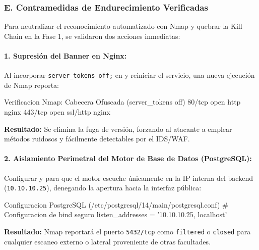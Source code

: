\subsubsection*{E. Contramedidas de Endurecimiento Verificadas}

Para neutralizar el reconocimiento automatizado con Nmap y quebrar la Kill Chain en la Fase 1, se validaron dos acciones inmediatas:

\paragraph{1. Supresión del Banner en Nginx:}
Al incorporar \texttt{server\_tokens off;} en  y reiniciar el servicio, una nueva ejecución de Nmap reporta:

\begin{cmdbox}{Verificacion Nmap: Cabecera Ofuscada (server\_tokens off)}
80/tcp  open  http     nginx
443/tcp open  ssl/http nginx
\end{cmdbox}

\textbf{Resultado:} Se elimina la fuga de versión, forzando al atacante a emplear métodos ruidosos y fácilmente detectables por el IDS/WAF.

\newpage
\paragraph{2. Aislamiento Perimetral del Motor de Base de Datos (PostgreSQL):}
Configurar  y  para que el motor escuche únicamente en la IP interna del backend (\texttt{10.10.10.25}), denegando la apertura hacia la interfaz pública:

\begin{cmdbox}{Configuracion PostgreSQL (/etc/postgresql/14/main/postgresql.conf)}
# Configuracion de bind seguro
listen_addresses = '10.10.10.25, localhost'
\end{cmdbox}

\textbf{Resultado:} Nmap reportará el puerto \texttt{5432/tcp} como \texttt{filtered} o \texttt{closed} para cualquier escaneo externo o lateral proveniente de otras facultades.

\vspace{0.8em}
